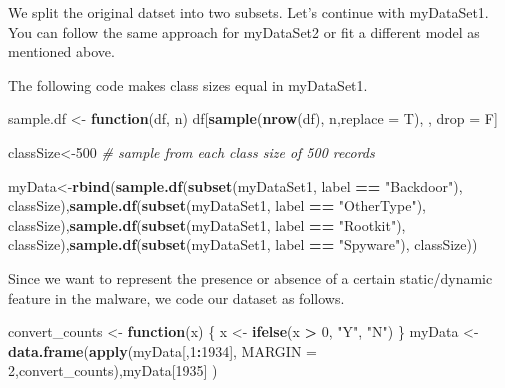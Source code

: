 \documentclass[]{article}
\newenvironment{Shaded}{\begin{snugshade}}{\end{snugshade}}
\newcommand{\CommentTok}[1]{\textcolor[rgb]{0.56,0.35,0.01}{\textit{#1}}}
\newcommand{\ControlFlowTok}[1]{\textcolor[rgb]{0.13,0.29,0.53}{\textbf{#1}}}
\newcommand{\DataTypeTok}[1]{\textcolor[rgb]{0.13,0.29,0.53}{#1}}
\newcommand{\DecValTok}[1]{\textcolor[rgb]{0.00,0.00,0.81}{#1}}
\newcommand{\KeywordTok}[1]{\textcolor[rgb]{0.13,0.29,0.53}{\textbf{#1}}}
\newcommand{\NormalTok}[1]{#1}
\newcommand{\OperatorTok}[1]{\textcolor[rgb]{0.81,0.36,0.00}{\textbf{#1}}}
\newcommand{\StringTok}[1]{\textcolor[rgb]{0.31,0.60,0.02}{#1}}
\begin{document}
We split the original datset into two subsets. Let's continue with
myDataSet1. You can follow the same approach for myDataSet2 or fit a
different model as mentioned above.

The following code makes class sizes equal in myDataSet1.

\begin{Shaded}
\begin{Highlighting}[]
\NormalTok{sample.df <-}\StringTok{ }\ControlFlowTok{function}\NormalTok{(df, n) df[}\KeywordTok{sample}\NormalTok{(}\KeywordTok{nrow}\NormalTok{(df), n,}\DataTypeTok{replace =}\NormalTok{ T), , drop =}\StringTok{ }\NormalTok{F]}

\NormalTok{classSize<-}\DecValTok{500} \CommentTok{# sample from each class size of 500 records}

\NormalTok{myData<-}\KeywordTok{rbind}\NormalTok{(}\KeywordTok{sample.df}\NormalTok{(}\KeywordTok{subset}\NormalTok{(myDataSet1, label }\OperatorTok{==}\StringTok{ "Backdoor"}\NormalTok{), classSize),}\KeywordTok{sample.df}\NormalTok{(}\KeywordTok{subset}\NormalTok{(myDataSet1, label }\OperatorTok{==}\StringTok{ "OtherType"}\NormalTok{), classSize),}\KeywordTok{sample.df}\NormalTok{(}\KeywordTok{subset}\NormalTok{(myDataSet1, label }\OperatorTok{==}\StringTok{ "Rootkit"}\NormalTok{), classSize),}\KeywordTok{sample.df}\NormalTok{(}\KeywordTok{subset}\NormalTok{(myDataSet1, label }\OperatorTok{==}\StringTok{ "Spyware"}\NormalTok{), classSize))}
\end{Highlighting}
\end{Shaded}

Since we want to represent the presence or absence of a certain
static/dynamic feature in the malware, we code our dataset as follows.

\begin{Shaded}
\begin{Highlighting}[]
\NormalTok{convert_counts <-}\StringTok{ }\ControlFlowTok{function}\NormalTok{(x) \{}
\NormalTok{  x <-}\StringTok{ }\KeywordTok{ifelse}\NormalTok{(x }\OperatorTok{>}\StringTok{ }\DecValTok{0}\NormalTok{, }\StringTok{"Y"}\NormalTok{, }\StringTok{"N"}\NormalTok{)}
\NormalTok{\}}
\NormalTok{myData <-}\StringTok{ }\KeywordTok{data.frame}\NormalTok{(}\KeywordTok{apply}\NormalTok{(myData[,}\DecValTok{1}\OperatorTok{:}\DecValTok{1934}\NormalTok{], }\DataTypeTok{MARGIN =} \DecValTok{2}\NormalTok{,convert_counts),myData[}\DecValTok{1935}\NormalTok{] )}
\end{Highlighting}
\end{Shaded}
\end{document}
